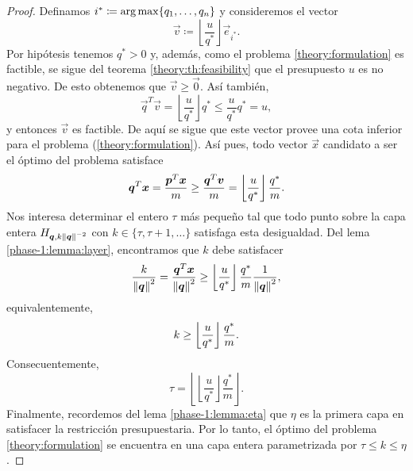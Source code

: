 \begin{proof}
	Definamos $i^* \coloneq \operatorname{arg\,max}\lbrace q_1, \ldots, q_n \rbrace$ y consideremos el vector
	\begin{equation*}
		\vec{v} \coloneq \left\lfloor \frac{u}{q^*} \right\rfloor \vec{e}_{i^*}.
	\end{equation*}
	Por hipótesis tenemos $q^* > 0$ y, además, como el problema
	\eqref{theory:formulation} es factible, se sigue del teorema \ref{theory:th:feasibility} que el
	presupuesto $u$ es no negativo. De esto obtenemos que $\vec{v} \geq \vec{0}$. Así también,
	\begin{equation*}
		\vec{q}^T\vec{v} = \left\lfloor \frac{u}{q^*} \right\rfloor q^*
		\leq \frac{u}{q^*}q^* = u,
	\end{equation*}
	y entonces $\vec{v}$ es factible. De aquí se sigue que este vector provee una cota inferior para
	el problema (\ref{theory:formulation}). Así pues, todo vector $\vec{x}$ candidato a ser el
	óptimo del problema satisface
	\begin{equation*}
		\boldsymbol{q}^T\boldsymbol{x} = \frac{\boldsymbol{p}^T\boldsymbol{x}}{m} \geq \frac{\boldsymbol{q}^T\boldsymbol{v}}{m} = 
		\left\lfloor \frac{u}{q^*} \right\rfloor \frac{q^*}{m}.
	\end{equation*}
	Nos interesa determinar el entero $\tau$ más pequeño tal que todo punto sobre la capa
	entera $H_{\boldsymbol{q}, k\left\lVert \boldsymbol{q} \right\rVert^{-2}}$ con $k \in \lbrace \tau, \tau + 1, \ldots \rbrace$
	satisfaga esta desigualdad. Del lema \ref{phase-1:lemma:layer}, encontramos que $k$ debe satisfacer
	\begin{equation*}
		\frac{k}{\left\lVert \boldsymbol{q} \right\rVert^{2}} = \frac{\boldsymbol{q}^T\boldsymbol{x}}{\left\lVert \boldsymbol{q} \right\rVert^2} \geq
		\left\lfloor \frac{u}{q^*} \right\rfloor \frac{q^*}{m}
		\frac{1}{\left\lVert \boldsymbol{q} \right\rVert^2},
	\end{equation*}
	equivalentemente,
	\begin{equation*}
		k \geq \left\lfloor \frac{u}{q^*} \right\rfloor\frac{q^*}{m}.
	\end{equation*}
	Consecuentemente,
	\begin{equation*}
		\tau =
		\left\lfloor \left\lfloor \frac{u}{q^*} \right\rfloor \frac{q^*}{m}
			\right\rfloor.
	\end{equation*}
	Finalmente, recordemos del lema \ref{phase-1:lemma:eta} que $\eta$ es la primera capa en
	satisfacer la restricción presupuestaria. Por lo tanto, el óptimo del problema
	\eqref{theory:formulation} se encuentra en una capa entera parametrizada por $\tau \leq k \leq \eta$.
\end{proof}

